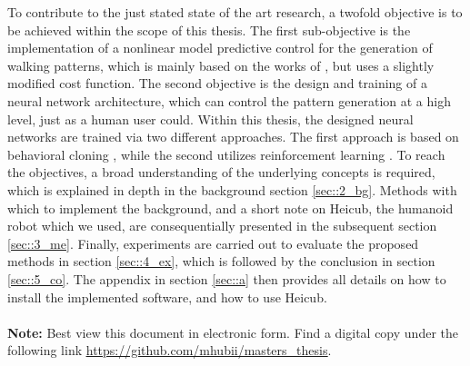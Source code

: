 To contribute to the just stated state of the art research, a twofold objective is to be achieved within the scope of this thesis. The first sub-objective is the implementation of a nonlinear model predictive control for the generation of walking patterns, which is mainly based on the works of \cite{naveau2016reactive}, but uses a slightly modified cost function. The second objective is the design and training of a neural network architecture, which can control the pattern generation at a high level, just as a human user could. Within this thesis, the designed neural networks are trained via two different approaches. The first approach is based on behavioral cloning \cite{bojarski2016end}, while the second utilizes reinforcement learning \cite{schulman2017proximal}. To reach the objectives, a broad understanding of the underlying concepts is required, which is explained in depth in the background section \ref{sec::2_bg}. Methods with which to implement the background, and a short note on Heicub, the humanoid robot which we used, are consequentially presented in the subsequent section \ref{sec::3_me}. Finally, experiments are carried out to evaluate the proposed methods in section \ref{sec::4_ex}, which is followed by the conclusion in section \ref{sec::5_co}. The appendix in section \ref{sec::a} then provides all details on how to install the implemented software, and how to use Heicub.
\\\\
\textbf{Note:} Best view this document in electronic form. Find a digital copy under the following link \href{https://github.com/mhubii/masters_thesis}{\underline{https://github.com/mhubii/masters\_thesis}}.

